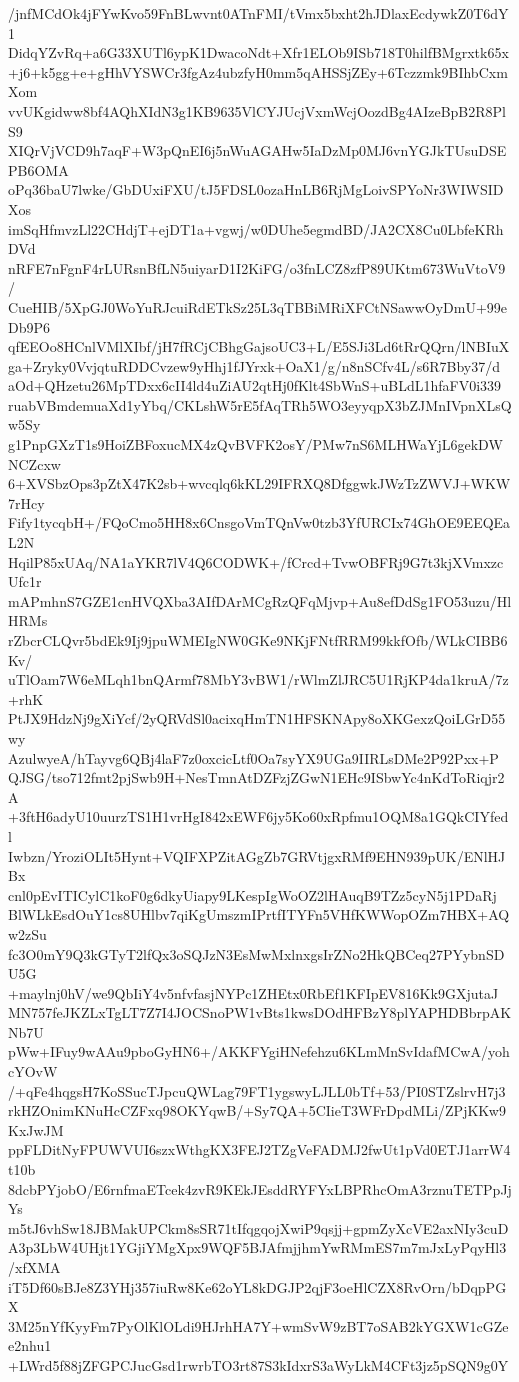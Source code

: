 /jnfMCdOk4jFYwKvo59FnBLwvnt0ATnFMI/tVmx5bxht2hJDlaxEcdywkZ0T6dY1
DidqYZvRq+a6G33XUTl6ypK1DwacoNdt+Xfr1ELOb9ISb718T0hilfBMgrxtk65x
+j6+k5gg+e+gHhVYSWCr3fgAz4ubzfyH0mm5qAHSSjZEy+6Tczzmk9BIhbCxmXom
vvUKgidww8bf4AQhXIdN3g1KB9635VlCYJUcjVxmWcjOozdBg4AIzeBpB2R8PlS9
XIQrVjVCD9h7aqF+W3pQnEI6j5nWuAGAHw5IaDzMp0MJ6vnYGJkTUsuDSEPB6OMA
oPq36baU7lwke/GbDUxiFXU/tJ5FDSL0ozaHnLB6RjMgLoivSPYoNr3WIWSIDXos
imSqHfmvzLl22CHdjT+ejDT1a+vgwj/w0DUhe5egmdBD/JA2CX8Cu0LbfeKRhDVd
nRFE7nFgnF4rLURsnBfLN5uiyarD1I2KiFG/o3fnLCZ8zfP89UKtm673WuVtoV9/
CueHIB/5XpGJ0WoYuRJcuiRdETkSz25L3qTBBiMRiXFCtNSawwOyDmU+99eDb9P6
qfEEOo8HCnlVMlXIbf/jH7fRCjCBhgGajsoUC3+L/E5SJi3Ld6tRrQQrn/lNBIuX
ga+Zryky0VvjqtuRDDCvzew9yHhj1fJYrxk+OaX1/g/n8nSCfv4L/s6R7Bby37/d
aOd+QHzetu26MpTDxx6cII4ld4uZiAU2qtHj0fKlt4SbWnS+uBLdL1hfaFV0i339
ruabVBmdemuaXd1yYbq/CKLshW5rE5fAqTRh5WO3eyyqpX3bZJMnIVpnXLsQw5Sy
g1PnpGXzT1s9HoiZBFoxucMX4zQvBVFK2osY/PMw7nS6MLHWaYjL6gekDWNCZcxw
6+XVSbzOps3pZtX47K2sb+wvcqlq6kKL29IFRXQ8DfggwkJWzTzZWVJ+WKW7rHcy
Fify1tycqbH+/FQoCmo5HH8x6CnsgoVmTQnVw0tzb3YfURCIx74GhOE9EEQEaL2N
HqilP85xUAq/NA1aYKR7lV4Q6CODWK+/fCrcd+TvwOBFRj9G7t3kjXVmxzcUfc1r
mAPmhnS7GZE1cnHVQXba3AIfDArMCgRzQFqMjvp+Au8efDdSg1FO53uzu/HlHRMs
rZbcrCLQvr5bdEk9Ij9jpuWMEIgNW0GKe9NKjFNtfRRM99kkfOfb/WLkCIBB6Kv/
uTlOam7W6eMLqh1bnQArmf78MbY3vBW1/rWlmZlJRC5U1RjKP4da1kruA/7z+rhK
PtJX9HdzNj9gXiYcf/2yQRVdSl0acixqHmTN1HFSKNApy8oXKGexzQoiLGrD55wy
AzulwyeA/hTayvg6QBj4laF7z0oxcicLtf0Oa7syYX9UGa9IIRLsDMe2P92Pxx+P
QJSG/tso712fmt2pjSwb9H+NesTmnAtDZFzjZGwN1EHc9ISbwYc4nKdToRiqjr2A
+3ftH6adyU10uurzTS1H1vrHgI842xEWF6jy5Ko60xRpfmu1OQM8a1GQkCIYfedl
Iwbzn/YroziOLIt5Hynt+VQIFXPZitAGgZb7GRVtjgxRMf9EHN939pUK/ENlHJBx
cnl0pEvITICylC1koF0g6dkyUiapy9LKespIgWoOZ2lHAuqB9TZz5cyN5j1PDaRj
BlWLkEsdOuY1cs8UHlbv7qiKgUmszmIPrtfITYFn5VHfKWWopOZm7HBX+AQw2zSu
fc3O0mY9Q3kGTyT2lfQx3oSQJzN3EsMwMxlnxgsIrZNo2HkQBCeq27PYybnSDU5G
+maylnj0hV/we9QbIiY4v5nfvfasjNYPc1ZHEtx0RbEf1KFIpEV816Kk9GXjutaJ
MN757feJKZLxTgLT7Z7I4JOCSnoPW1vBts1kwsDOdHFBzY8plYAPHDBbrpAKNb7U
pWw+IFuy9wAAu9pboGyHN6+/AKKFYgiHNefehzu6KLmMnSvIdafMCwA/yohcYOvW
/+qFe4hqgsH7KoSSucTJpcuQWLag79FT1ygswyLJLL0bTf+53/PI0STZslrvH7j3
rkHZOnimKNuHcCZFxq98OKYqwB/+Sy7QA+5CIieT3WFrDpdMLi/ZPjKKw9KxJwJM
ppFLDitNyFPUWVUI6szxWthgKX3FEJ2TZgVeFADMJ2fwUt1pVd0ETJ1arrW4t10b
8dcbPYjobO/E6rnfmaETcek4zvR9KEkJEsddRYFYxLBPRhcOmA3rznuTETPpJjYs
m5tJ6vhSw18JBMakUPCkm8sSR71tIfqgqojXwiP9qsjj+gpmZyXcVE2axNIy3cuD
A3p3LbW4UHjt1YGjiYMgXpx9WQF5BJAfmjjhmYwRMmES7m7mJxLyPqyHl3/xfXMA
iT5Df60sBJe8Z3YHj357iuRw8Ke62oYL8kDGJP2qjF3oeHlCZX8RvOrn/bDqpPGX
3M25nYfKyyFm7PyOlKlOLdi9HJrhHA7Y+wmSvW9zBT7oSAB2kYGXW1cGZee2nhu1
+LWrd5f88jZFGPCJucGsd1rwrbTO3rt87S3kIdxrS3aWyLkM4CFt3jz5pSQN9g0Y

